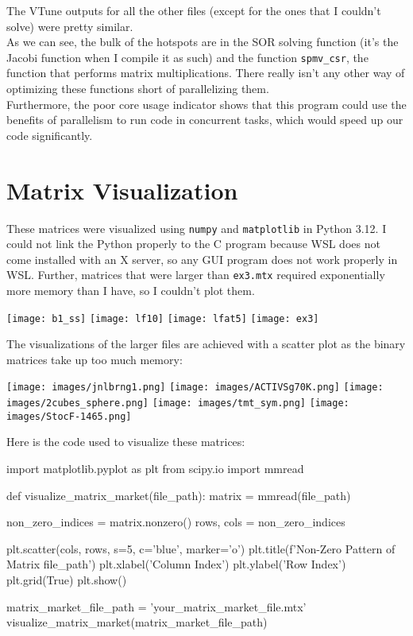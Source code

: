 \documentclass[12pt]{article}
\begin{document}
    The VTune outputs for all the other files (except for the ones that I couldn't solve) were pretty similar. \\

    As we can see, the bulk of the hotspots are in the SOR solving function (it's the Jacobi function when I compile it as such) and the function \verb|spmv_csr|, the function that performs matrix multiplications. There really isn't any other way of optimizing these functions short of parallelizing them. \\

    Furthermore, the poor core usage indicator shows that this program could use the benefits of parallelism to run code in concurrent tasks, which would speed up our code significantly.
    \newpage

    \section{Matrix Visualization}
    These matrices were visualized using \verb|numpy| and \verb|matplotlib| in Python 3.12. I could not link the Python properly to the C program because WSL does not come installed with an X server, so any GUI program does not work properly in WSL. Further, matrices that were larger than \verb|ex3.mtx| required exponentially more memory than I have, so I couldn't plot them.

    \begin{center}
        \texttt{[image: b1\_ss]}
        \texttt{[image: lf10]}
        \texttt{[image: lfat5]}
        \texttt{[image: ex3]}
    \end{center}

    The visualizations of the larger files are achieved with a scatter plot as the binary matrices take up too much memory:

    \begin{center}
        \texttt{[image: images/jnlbrng1.png]}
        \texttt{[image: images/ACTIVSg70K.png]}
        \texttt{[image: images/2cubes\_sphere.png]}
        \texttt{[image: images/tmt\_sym.png]}
        \texttt{[image: images/StocF-1465.png]}
    \end{center}

    \newpage
    Here is the code used to visualize these matrices:

    \begin{python}
import matplotlib.pyplot as plt
from scipy.io import mmread

def visualize_matrix_market(file_path):
    matrix = mmread(file_path)

    non_zero_indices = matrix.nonzero()
    rows, cols = non_zero_indices

    plt.scatter(cols, rows, s=5, c='blue', marker='o')
    plt.title(f'Non-Zero Pattern of Matrix {file_path}')
    plt.xlabel('Column Index')
    plt.ylabel('Row Index')
    plt.grid(True)
    plt.show()

matrix_market_file_path = 'your_matrix_market_file.mtx'
visualize_matrix_market(matrix_market_file_path)
    \end{python}
\end{document}

